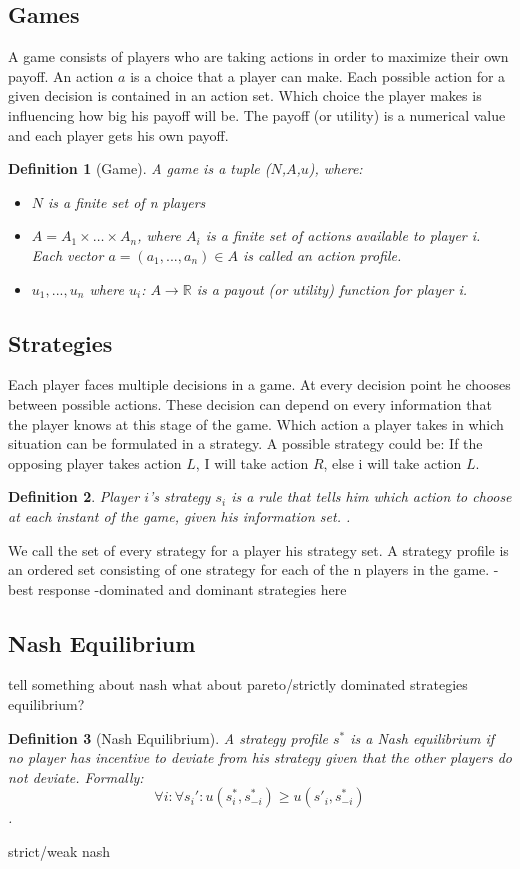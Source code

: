 \documentclass{cacthesis}
\newtheorem{definition}{Definition}
\begin{document}
\subsection{Games}
A game consists of players who are taking actions in order to maximize their own payoff. An action $a$ is a choice that a player can make. Each possible action for a given decision is contained in an action set. Which choice the player makes is influencing how big his payoff will be. The payoff (or utility) is a numerical value and each player gets his own payoff.
\begin{definition}[Game]
A game is a tuple ($N$,$A$,$u$), where:
\begin{itemize}
    \item $N$ is a finite set of n players
    \item $A = A_1 \times \dots \times A_n$, where $A_i$ is a finite set of actions available to player i. Each vector $a= (a_1,...,a_n) \in A$ is called an action profile.
    \item $u_1,...,u_n$ where $u_i$: $A \to \mathbb{R}$ is a payout (or utility) function for player i.
\end{itemize} {\normalfont \cite{leyton-brown_essentials_2008}}
\end{definition}
\subsection{Strategies}
Each player faces multiple decisions in a game. At every decision point he chooses between possible actions. These decision can depend on every information that the player knows at this stage of the game. Which action a player takes in which situation can be formulated in a strategy. A possible strategy could be: If the opposing player takes action $L$, I will take action $R$, else i will take action $L$.
\begin{definition}
Player $i$'s strategy $s_i$ is a rule that tells him which action to choose at each instant of the game, given his information set. {\normalfont \cite{rasmusen_games_nodate}}.
\end{definition}
We call the set of every strategy for a player his strategy set. A strategy profile is an ordered set consisting of one strategy for each of the n players in the game.
- best response
-dominated and dominant strategies here
\subsection{Nash Equilibrium}
tell something about nash\newline
what about pareto/strictly dominated strategies equilibrium?
\begin{definition}[Nash Equilibrium]
A strategy profile $s^*$ is a Nash equilibrium if no player has incentive to deviate from his strategy given that the other players do not deviate. {\normalfont \cite{rasmusen_games_nodate}} Formally: \[\forall i: \forall s_i': u(s^*_i,s^*_{-i}) \geq u(s'_i,s^*_{-i})\].
\end{definition}
strict/weak nash
\end{document}
